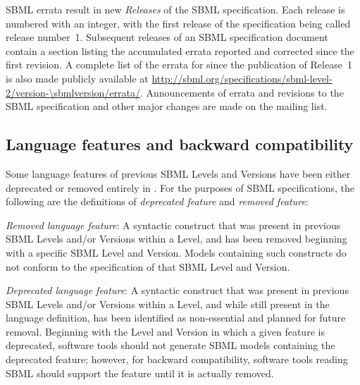 SBML errata result in new \emph{Releases} of the SBML
specification.  Each release is numbered with an integer, with the
first release of the specification being called release number~1.
Subsequent releases of an SBML specification document contain a
section listing the accumulated errata reported and corrected
since the first revision.  A complete list of the errata for
\changed{\sbmltwothree} since the publication of Release~1 is also
made publicly available at
\url{http://sbml.org/specifications/sbml-level-2/version-\sbmlversion/errata/}.
Announcements of errata and revisions to the SBML specification
and other major changes are made on the
 mailing
list.


\subsection{Language features and backward compatibility}
\label{sec:deprecated-features}

Some language features of previous SBML Levels and Versions have
been either deprecated or removed entirely in \changed{\sbmltwothree}.  For
the purposes of SBML specifications, the following are the
definitions of \emph{deprecated feature} and \emph{removed
  feature}:
\begin{description}
  
\item \emph{Removed language feature}: A syntactic construct that
  was present in previous SBML Levels and/or Versions within a
  Level, and has been removed beginning with a specific SBML Level
  and Version.  Models containing such constructs do not conform
  to the specification of that SBML Level and Version.
  
\item \emph{Deprecated language feature}: A syntactic construct
  that was present in previous SBML Levels and/or Versions within
  a Level, and while still present in the language definition, has
  been identified as non-essential and planned for future removal.
  Beginning with the Level and Version in which a given feature is
  deprecated, software tools should not generate SBML models
  containing the deprecated feature; however, for backward
  compatibility, software tools reading SBML should support the
  feature until it is actually removed.

\end{description}

